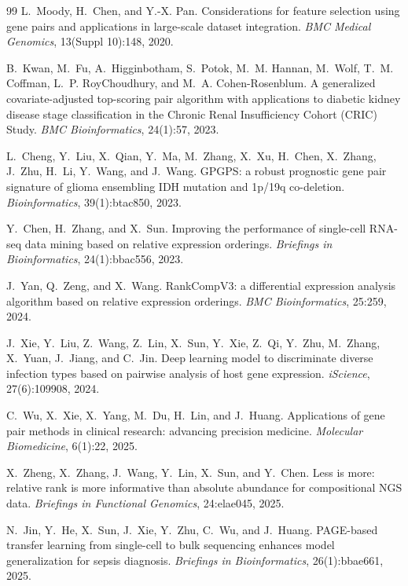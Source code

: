 \documentclass[journal]{IEEEtran}
\begin{document}
\begin{thebibliography}{99}
L.~Moody, H.~Chen, and Y.-X. Pan.
\newblock Considerations for feature selection using gene pairs and applications in large-scale dataset integration.
\newblock \emph{BMC Medical Genomics}, 13(Suppl 10):148, 2020.

B.~Kwan, M.~Fu, A.~Higginbotham, S.~Potok, M.~M. Hannan, M.~Wolf, T.~M. Coffman, L.~P. RoyChoudhury, and M.~A. Cohen-Rosenblum.
\newblock A generalized covariate-adjusted top-scoring pair algorithm with applications to diabetic kidney disease stage classification in the Chronic Renal Insufficiency Cohort (CRIC) Study.
\newblock \emph{BMC Bioinformatics}, 24(1):57, 2023.

L.~Cheng, Y.~Liu, X.~Qian, Y.~Ma, M.~Zhang, X.~Xu, H.~Chen, X.~Zhang, J.~Zhu, H.~Li, Y.~Wang, and J.~Wang.
\newblock GPGPS: a robust prognostic gene pair signature of glioma ensembling IDH mutation and 1p/19q co-deletion.
\newblock \emph{Bioinformatics}, 39(1):btac850, 2023.

Y.~Chen, H.~Zhang, and X.~Sun.
\newblock Improving the performance of single-cell RNA-seq data mining based on relative expression orderings.
\newblock \emph{Briefings in Bioinformatics}, 24(1):bbac556, 2023.

J.~Yan, Q.~Zeng, and X.~Wang.
\newblock RankCompV3: a differential expression analysis algorithm based on relative expression orderings.
\newblock \emph{BMC Bioinformatics}, 25:259, 2024.

J.~Xie, Y.~Liu, Z.~Wang, Z.~Lin, X.~Sun, Y.~Xie, Z.~Qi, Y.~Zhu, M.~Zhang, X.~Yuan, J.~Jiang, and C.~Jin.
\newblock Deep learning model to discriminate diverse infection types based on pairwise analysis of host gene expression.
\newblock \emph{iScience}, 27(6):109908, 2024.

C.~Wu, X.~Xie, X.~Yang, M.~Du, H.~Lin, and J.~Huang.
\newblock Applications of gene pair methods in clinical research: advancing precision medicine.
\newblock \emph{Molecular Biomedicine}, 6(1):22, 2025.

X.~Zheng, X.~Zhang, J.~Wang, Y.~Lin, X.~Sun, and Y.~Chen.
\newblock Less is more: relative rank is more informative than absolute abundance for compositional NGS data.
\newblock \emph{Briefings in Functional Genomics}, 24:elae045, 2025.

N.~Jin, Y.~He, X.~Sun, J.~Xie, Y.~Zhu, C.~Wu, and J.~Huang.
\newblock PAGE-based transfer learning from single-cell to bulk sequencing enhances model generalization for sepsis diagnosis.
\newblock \emph{Briefings in Bioinformatics}, 26(1):bbae661, 2025.


\end{thebibliography}
\end{document}
